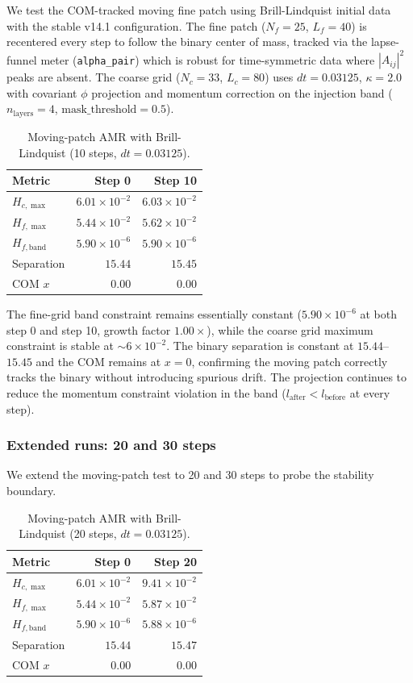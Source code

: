We test the COM-tracked moving fine patch using Brill-Lindquist initial data with the stable v14.1 configuration. The fine patch ($N_f=25$, $L_f=40$) is recentered every step to follow the binary center of mass, tracked via the lapse-funnel meter (\texttt{alpha\_pair}) which is robust for time-symmetric data where $|A_{ij}|^2$ peaks are absent. The coarse grid ($N_c=33$, $L_c=80$) uses $dt=0.03125$, $\kappa=2.0$ with covariant $\phi$ projection and momentum correction on the injection band ($n_{\text{layers}}=4$, $\text{mask\_threshold}=0.5$).

\begin{table}[t]
\centering
\caption{Moving-patch AMR with Brill-Lindquist (10 steps, $dt=0.03125$).}
\label{tab:amr-moving-10}
\begin{tabular}{lrr}
\hline
Metric & Step 0 & Step 10 \\
\hline
$H_{c,\max}$ & $6.01\times 10^{-2}$ & $6.03\times 10^{-2}$ \\
$H_{f,\max}$ & $5.44\times 10^{-2}$ & $5.62\times 10^{-2}$ \\
$H_{f,\text{band}}$ & $5.90\times 10^{-6}$ & $5.90\times 10^{-6}$ \\
Separation & $15.44$ & $15.45$ \\
COM $x$ & $0.00$ & $0.00$ \\
\hline
\end{tabular}
\end{table}

The fine-grid band constraint remains essentially constant ($5.90\times 10^{-6}$ at both step 0 and step 10, growth factor $1.00\times$), while the coarse grid maximum constraint is stable at $\sim 6\times 10^{-2}$. The binary separation is constant at $15.44$--$15.45$ and the COM remains at $x=0$, confirming the moving patch correctly tracks the binary without introducing spurious drift. The projection continues to reduce the momentum constraint violation in the band ($l_{\text{after}} < l_{\text{before}}$ at every step).

\subsubsection{Extended runs: 20 and 30 steps}

We extend the moving-patch test to 20 and 30 steps to probe the stability boundary.

\begin{table}[t]
\centering
\caption{Moving-patch AMR with Brill-Lindquist (20 steps, $dt=0.03125$).}
\label{tab:amr-moving-20}
\begin{tabular}{lrr}
\hline
Metric & Step 0 & Step 20 \\
\hline
$H_{c,\max}$ & $6.01\times 10^{-2}$ & $9.41\times 10^{-2}$ \\
$H_{f,\max}$ & $5.44\times 10^{-2}$ & $5.87\times 10^{-2}$ \\
$H_{f,\text{band}}$ & $5.90\times 10^{-6}$ & $5.88\times 10^{-6}$ \\
Separation & $15.44$ & $15.47$ \\
COM $x$ & $0.00$ & $0.00$ \\
\hline
\end{tabular}
\end{table}


